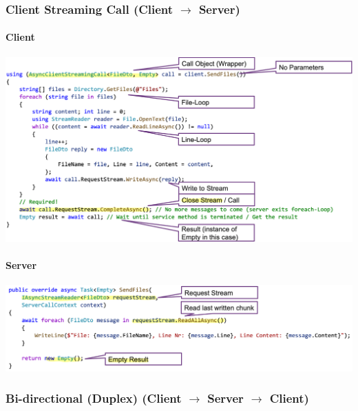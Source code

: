 \subsubsection{Client Streaming Call (Client $\rightarrow$ Server)}
\paragraph{Client}
\begin{center}
    \includegraphics[scale=.39]{graphic/gprc/Client Streaming Call client.png}
\end{center}
\vspace{-8pt}
\paragraph{Server}
\begin{center}
    \includegraphics[scale=.38]{graphic/gprc/Client Streaming Call service.png}
\end{center}
\vspace{-8pt}

\subsubsection{Bi-directional (Duplex) (Client $\rightarrow$ Server $\rightarrow$ Client)}

